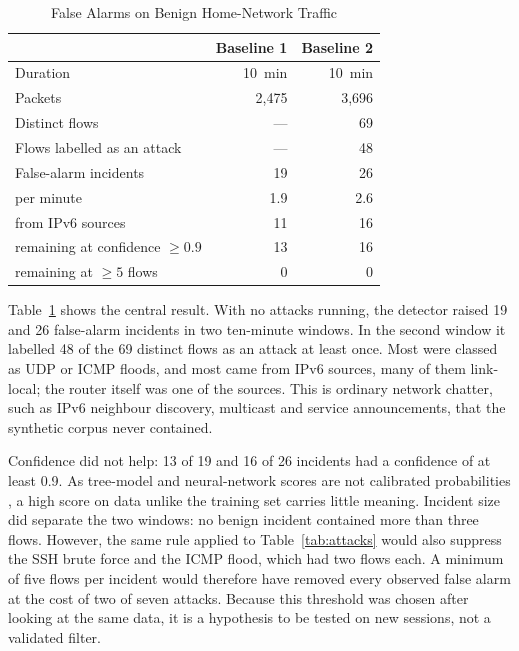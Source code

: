 \documentclass[conference]{IEEEtran}
\begin{document}
\begin{table}[t]
\caption{False Alarms on Benign Home-Network Traffic}
\label{tab:benign}
\centering
\begin{tabular}{@{}lrr@{}}
\toprule
 & Baseline 1 & Baseline 2 \\
\midrule
Duration                                & 10~min & 10~min \\
Packets                                 & 2{,}475 & 3{,}696 \\
Distinct flows                          & --- & 69 \\
Flows labelled as an attack             & --- & 48 \\
False-alarm incidents                   & 19 & 26 \\
\quad per minute                        & 1.9 & 2.6 \\
\quad from IPv6 sources                 & 11 & 16 \\
\quad remaining at confidence $\ge 0.9$ & 13 & 16 \\
\quad remaining at $\ge 5$ flows        & 0 & 0 \\
\bottomrule
\end{tabular}
\end{table}

Table~\ref{tab:benign} shows the central result. With no attacks running,
the detector raised 19 and 26 false-alarm incidents in two ten-minute
windows. In the second window it labelled 48 of the 69 distinct flows as an
attack at least once. Most were classed as UDP or ICMP floods, and most
came from IPv6 sources, many of them link-local; the router itself was one
of the sources. This is ordinary network chatter, such as IPv6 neighbour
discovery, multicast and service announcements, that the synthetic corpus
never contained.

Confidence did not help: 13 of 19 and 16 of 26 incidents had a confidence
of at least 0.9. As tree-model and neural-network scores are not calibrated
probabilities \cite{guo2017calibration}, a high score on data unlike the
training set carries little meaning. Incident size did separate the two
windows: no benign incident contained more than three flows. However, the
same rule applied to Table~\ref{tab:attacks} would also suppress the SSH
brute force and the ICMP flood, which had two flows each. A minimum of five
flows per incident would therefore have removed every observed false alarm
at the cost of two of seven attacks. Because this threshold was chosen
after looking at the same data, it is a hypothesis to be tested on new
sessions, not a validated filter.
\end{document}
